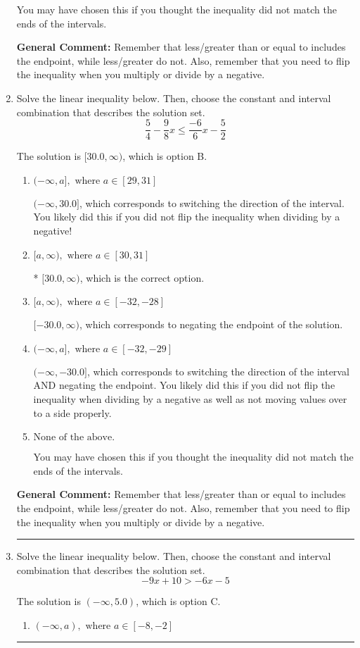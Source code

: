 \documentclass{extbook}[14pt]
\newcommand{\litem}[1]{\item #1

\rule{\textwidth}{0.4pt}}
\begin{document}
\begin{enumerate}
{\begin{enumerate}[label=\Alph*.]
You may have chosen this if you thought the inequality did not match the ends of the intervals.
\end{enumerate}

\textbf{General Comment:} Remember that less/greater than or equal to includes the endpoint, while less/greater do not. Also, remember that you need to flip the inequality when you multiply or divide by a negative.
}
\litem{
Solve the linear inequality below. Then, choose the constant and interval combination that describes the solution set.
\[ \frac{5}{4} - \frac{9}{8} x \leq \frac{-6}{6} x - \frac{5}{2} \]

The solution is \( [30.0, \infty) \), which is option B.\begin{enumerate}[label=\Alph*.]
\item \( (-\infty, a], \text{ where } a \in [29, 31] \)

 $(-\infty, 30.0]$, which corresponds to switching the direction of the interval. You likely did this if you did not flip the inequality when dividing by a negative!
\item \( [a, \infty), \text{ where } a \in [30, 31] \)

* $[30.0, \infty)$, which is the correct option.
\item \( [a, \infty), \text{ where } a \in [-32, -28] \)

 $[-30.0, \infty)$, which corresponds to negating the endpoint of the solution.
\item \( (-\infty, a], \text{ where } a \in [-32, -29] \)

 $(-\infty, -30.0]$, which corresponds to switching the direction of the interval AND negating the endpoint. You likely did this if you did not flip the inequality when dividing by a negative as well as not moving values over to a side properly.
\item \( \text{None of the above}. \)

You may have chosen this if you thought the inequality did not match the ends of the intervals.
\end{enumerate}

\textbf{General Comment:} Remember that less/greater than or equal to includes the endpoint, while less/greater do not. Also, remember that you need to flip the inequality when you multiply or divide by a negative.
}
\litem{
Solve the linear inequality below. Then, choose the constant and interval combination that describes the solution set.
\[ -9x + 10 > -6x -5 \]

The solution is \( (-\infty, 5.0) \), which is option C.\begin{enumerate}[label=\Alph*.]
\item \( (-\infty, a), \text{ where } a \in [-8, -2] \)


\end{enumerate}}
\end{enumerate}
\end{document}
